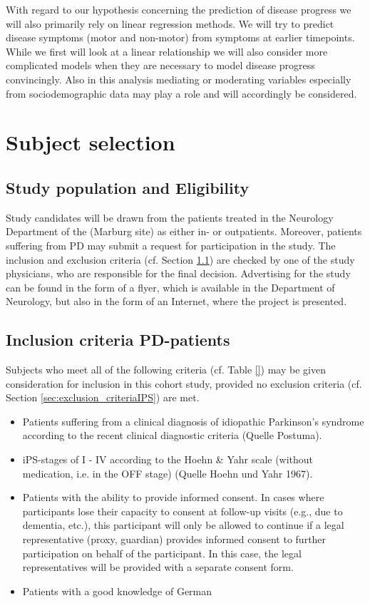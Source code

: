With regard to our hypothesis concerning the prediction of disease progress we will also primarily rely on linear regression methods. We will try to predict disease symptoms (motor and non-motor) from symptoms at earlier timepoints. While we first will look at a linear relationship we will also consider more complicated models when they are necessary to model disease progress convincingly. Also in this analysis mediating or moderating variables especially from sociodemographic data may play a role and will accordingly be considered.


\section{Subject selection}
\label{sec:study_selection}
\subsection{Study population and Eligibility}
\label{sec:study_population}
Study candidates will be drawn from the patients treated in the Neurology Department of the \UKGM (Marburg site) as either in- or outpatients. Moreover, patients suffering from \ac{PD} may submit a request for participation in the study. The inclusion and exclusion criteria (cf. Section \ref{sec:study_population}) are checked by one of the study physicians, who are responsible for the final decision. Advertising for the study can be found in the form of a flyer, which is available in the Department of Neurology, but also in the form of an Internet, where the project is presented.

\subsection{Inclusion criteria \ac{PD}-patients}
\label{sec:inclusion_criteriaIPS}
Subjects who meet all of the following criteria (cf. Table \ref{}) may be given consideration for inclusion in this cohort study, provided no exclusion criteria (cf. Section \ref{sec:exclusion_criteriaIPS}) are met.

\begin{itemize}
\item Patients suffering from a clinical diagnosis of idiopathic Parkinson's syndrome according to the recent clinical diagnostic criteria (Quelle Postuma).
\item \ac{iPS}-stages of I - IV according to the Hoehn \& Yahr scale (without medication, i.e. in the OFF stage) (Quelle Hoehn und Yahr 1967).
\item Patients with the ability to provide informed consent. In cases where participants lose their capacity to consent at follow-up visits (e.g., due to dementia, etc.), this participant will only be allowed to continue if a legal representative (proxy, guardian) provides informed consent to further participation on behalf of the participant. In this case, the legal representatives will be provided with a separate consent form.   
\item Patients with a good knowledge of German
\end{itemize}

